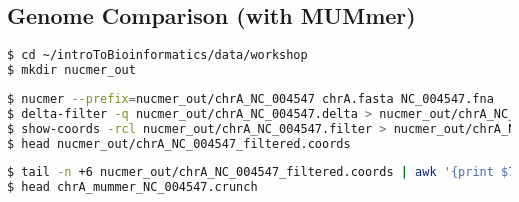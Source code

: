 \documentclass[a4paper]{article}
\begin{document}
\subsection*{Genome Comparison (with MUMmer)}

\begin{lstlisting}[language=bash]
$ cd ~/introToBioinformatics/data/workshop
$ mkdir nucmer_out
\end{lstlisting}

\begin{lstlisting}[language=bash]
$ nucmer --prefix=nucmer_out/chrA_NC_004547 chrA.fasta NC_004547.fna
$ delta-filter -q nucmer_out/chrA_NC_004547.delta > nucmer_out/chrA_NC_004547.filter
$ show-coords -rcl nucmer_out/chrA_NC_004547.filter > nucmer_out/chrA_NC_004547_filtered.coords
$ head nucmer_out/chrA_NC_004547_filtered.coords
\end{lstlisting}

\begin{lstlisting}[language=bash]
$ tail -n +6 nucmer_out/chrA_NC_004547_filtered.coords | awk '{print $7" "$10" "$1" "$2" "$12" "$4" "$5" "$13}' > chrA_mummer_NC_004547.crunch
$ head chrA_mummer_NC_004547.crunch
\end{lstlisting}
\end{document}

